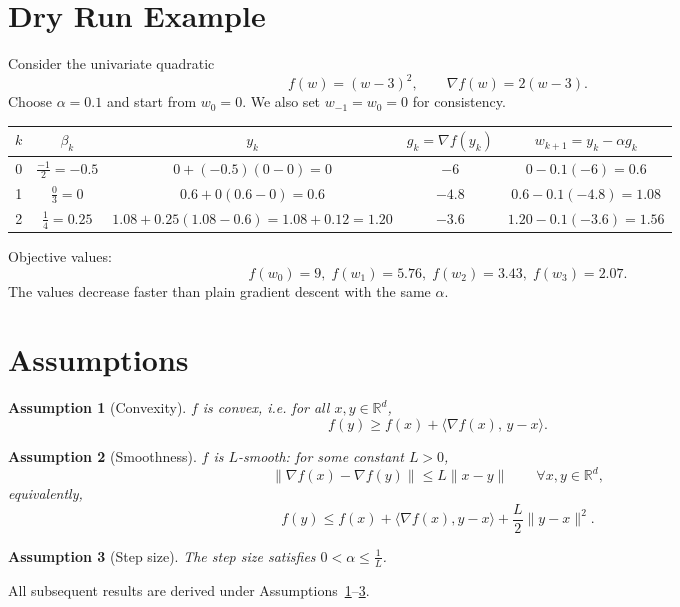 \documentclass{article}
\newtheorem{assumption}{Assumption}
\newcommand{\R}{\mathbb{R}}
\begin{document}
\section*{Dry Run Example}
Consider the univariate quadratic
\[
f(w) = (w-3)^2,\qquad \nabla f(w)=2(w-3).
\]
Choose \(\alpha=0.1\) and start from \(w_0=0\).  
We also set \(w_{-1}=w_0=0\) for consistency.

\begin{center}
\begin{tabular}{c|c|c|c|c}
\(k\) & \(\beta_k\) & \(y_k\) & \(g_k=\nabla f(y_k)\) & \(w_{k+1}=y_k-\alpha g_k\) \\ \hline
0 & \(\displaystyle\frac{-1}{2}= -0.5\) & \(0+(-0.5)(0-0)=0\) & \(-6\) & \(0-0.1(-6)=0.6\) \\[4pt]
1 & \(\displaystyle\frac{0}{3}=0\) & \(0.6+0(0.6-0)=0.6\) & \(-4.8\) & \(0.6-0.1(-4.8)=1.08\) \\[4pt]
2 & \(\displaystyle\frac{1}{4}=0.25\) & \(1.08+0.25(1.08-0.6)=1.08+0.12=1.20\) & \(-3.6\) & \(1.20-0.1(-3.6)=1.56\)
\end{tabular}
\end{center}

Objective values:
\[
f(w_0)=9,\; f(w_1)=5.76,\; f(w_2)=3.43,\; f(w_3)=2.07.
\]
The values decrease faster than plain gradient descent with the same \(\alpha\).

\section*{Assumptions}
\begin{assumption}[Convexity]\label{as:convex}
\(f\) is convex, i.e. for all \(x,y\in\R^d\),
\[
f(y)\ge f(x)+\langle\nabla f(x),\,y-x\rangle .
\]
\end{assumption}
\begin{assumption}[Smoothness]\label{as:smooth}
\(f\) is \(L\)-smooth: for some constant \(L>0\),
\[
\|\nabla f(x)-\nabla f(y)\|\le L\|x-y\|\qquad\forall x,y\in\R^d,
\]
equivalently,
\[
f(y)\le f(x)+\langle\nabla f(x),y-x\rangle+\frac{L}{2}\|y-x\|^{2}.
\]
\end{assumption}
\begin{assumption}[Step size]\label{as:step}
The step size satisfies \(0<\alpha\le \frac{1}{L}\).
\end{assumption}
All subsequent results are derived under Assumptions~\ref{as:convex}--\ref{as:step}.
\end{document}
